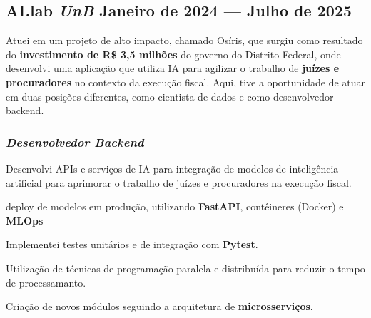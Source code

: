 \documentclass[a4paper,12pt]{article}
\begin{document}



\subsection*{\large AI.lab \textbf{\textit{UnB}} \hfill Janeiro de 2024 --- Julho de 2025}
\vspace{0.5em}


Atuei em um projeto de alto impacto, chamado Osíris, que surgiu como resultado do \textbf{investimento de R\$ 3,5
milhões} do governo do Distrito Federal, onde desenvolvi uma aplicação que utiliza IA
para agilizar o trabalho de \textbf{juízes e procuradores} no contexto da execução fiscal. Aqui, tive a oportunidade
de atuar em duas posições diferentes, como cientista de dados e como desenvolvedor backend.

\subsubsection*{\small \textit{Desenvolvedor Backend} }
\vspace{-1.3em}
\vspace{-0.5em}
\begin{zitemize}
    \item Desenvolvi APIs e serviços de IA para integração de modelos de inteligência artificial para aprimorar o trabalho de juízes e procuradores na execução fiscal.
    \item deploy de modelos em produção, utilizando  \textbf{FastAPI}, contêineres (Docker) e \textbf{MLOps}
    \item Implementei testes unitários e de integração com \textbf{Pytest}.
    \item Utilização de técnicas de programação paralela e distribuída para reduzir o tempo de processamanto.
    \item Criação de novos módulos seguindo a arquitetura de \textbf{microsserviços}.
\end{zitemize}
\end{document}
